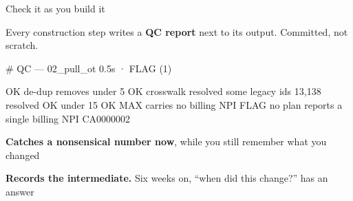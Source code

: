 \documentclass[notes,11pt, aspectratio=169, xcolor={table}]{beamer}
\newenvironment{wideitemize}{\itemize\addtolength{\itemsep}{3pt}}{\enditemize}
\begin{document}
\begin{frame}[fragile]{Check it as you build it}

Every construction step writes a \textbf{QC report} next to its output. Committed, not scratch.

\vspace{0.5em}
\footnotesize
\begin{semiverbatim}
\color{blue}# QC — 02_pull_ot                      0.5s  ·  FLAG (1)\color{black}

  OK     de-dup removes under 5%
  OK     crosswalk resolved some legacy ids          13,138 resolved
  OK     under 15%
  OK     MAX carries no billing NPI
  \color{red}FLAG   no plan reports a single billing NPI     CA0000002\color{black}
\end{semiverbatim}

\vspace{0.8em}
\normalsize
\begin{wideitemize}
\item \textbf{Catches a nonsensical number now}, while you still remember what you changed
\item \textbf{Records the intermediate.} Six weeks on, ``when did this change?'' has an answer
\end{wideitemize}

\end{frame}
\end{document}
